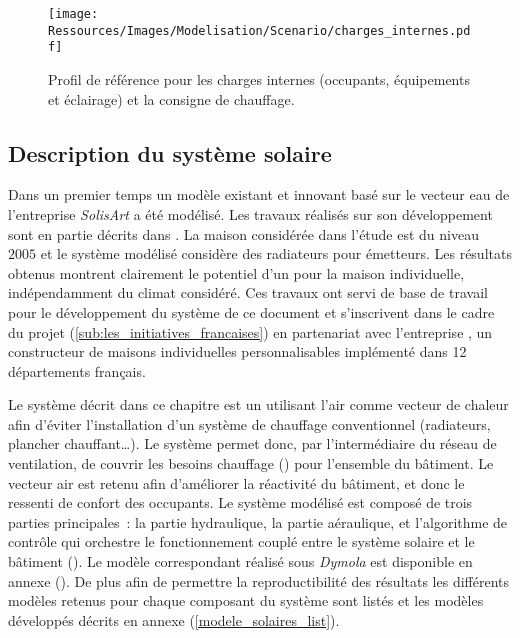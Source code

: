 \begin{figure}
    \centering
    \texttt{[image: Ressources/Images/Modelisation/Scenario/charges\_internes.pdf]}
    \caption[Profil de référence pour les charges internes et la consigne de chauffage]
            {Profil de référence pour les charges internes (occupants, équipements et éclairage)
             et la consigne de chauffage.}
    \label{fig:scenario_reference}
\end{figure}


\subsection{Description du système solaire} %
\label{sub:description_du_systeme_solaire}
Dans un premier temps un modèle existant et innovant basé sur le vecteur eau
de l’entreprise \textit{SolisArt} a été modélisé. Les travaux réalisés sur son
développement sont en partie décrits dans \textcite{Bois2015}. La maison considérée dans
l’étude est du niveau \,$2005$ et le système modélisé considère des radiateurs
pour émetteurs. Les résultats obtenus montrent clairement le potentiel d’un 
pour la maison individuelle, indépendamment du climat considéré. Ces travaux
ont servi de base de travail pour le développement du système de ce document et
s’inscrivent dans le cadre du projet  (\ref{sub:les_initiatives_francaises})
en partenariat avec l’entreprise , un constructeur de maisons individuelles
personnalisables implémenté dans \num{12} départements français.

Le système décrit dans ce chapitre est un  utilisant l’air comme vecteur de chaleur
afin d’éviter l’installation d’un système de chauffage conventionnel (radiateurs, plancher
chauffant\dots). Le système permet donc, par l’intermédiaire du réseau de ventilation, de
couvrir les besoins chauffage () pour l’ensemble du bâtiment.
Le vecteur air est retenu afin d’améliorer la réactivité du bâtiment, et donc le
ressenti de confort des occupants. Le système modélisé est composé de trois
parties principales~: la partie hydraulique, la partie aéraulique, et l’algorithme de
contrôle qui orchestre le fonctionnement couplé entre le système solaire et le bâtiment
(). Le modèle correspondant réalisé sous \textit{Dymola} est disponible
en annexe ().
De plus afin de permettre la reproductibilité des résultats les différents
modèles retenus pour chaque composant du système sont listés et les modèles développés
décrits en annexe (\ref{modele_solaires_list}).

